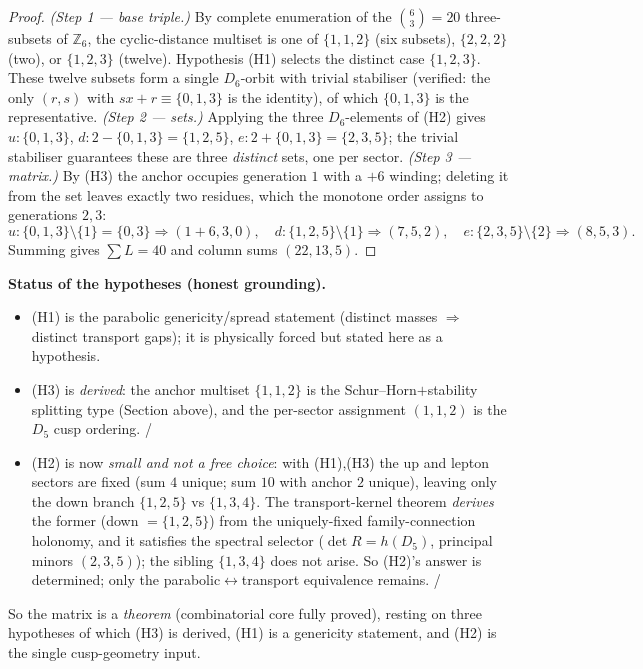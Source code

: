 \documentclass[11pt,a4paper]{article}
\theoremstyle{definition}
\begin{document}
\begin{proof}
\emph{(Step 1 --- base triple.)} By complete enumeration of the $\binom63=20$ three-subsets of
$\mathbb Z_6$, the cyclic-distance multiset is one of $\{1,1,2\}$ (six subsets), $\{2,2,2\}$ (two), or
$\{1,2,3\}$ (twelve). Hypothesis (H1) selects the distinct case $\{1,2,3\}$. These twelve subsets form a
single $D_6$-orbit with trivial stabiliser (verified: the only $(r,s)$ with $sx+r\equiv\{0,1,3\}$ is the
identity), of which $\{0,1,3\}$ is the representative. \emph{(Step 2 --- sets.)} Applying the three
$D_6$-elements of (H2) gives $u:\{0,1,3\}$, $d:2{-}\{0,1,3\}=\{1,2,5\}$, $e:2{+}\{0,1,3\}=\{2,3,5\}$;
the trivial stabiliser guarantees these are three \emph{distinct} sets, one per sector.
\emph{(Step 3 --- matrix.)} By (H3) the anchor occupies generation $1$ with a $+6$ winding; deleting it
from the set leaves exactly two residues, which the monotone order assigns to generations $2,3$:
\[
  u:\{0,1,3\}\!\setminus\!\{1\}=\{0,3\}\Rightarrow(1{+}6,3,0),\quad
  d:\{1,2,5\}\!\setminus\!\{1\}\Rightarrow(7,5,2),\quad
  e:\{2,3,5\}\!\setminus\!\{2\}\Rightarrow(8,5,3).
\]
Summing gives $\sum L=40$ and column sums $(22,13,5)$.
\end{proof}

\noindent\textbf{Status of the hypotheses (honest grounding).}
\begin{itemize}[leftmargin=1.6em]
\item (H1) is the parabolic genericity/spread statement (distinct masses $\Rightarrow$ distinct
transport gaps); it is physically forced but stated here as a hypothesis. \mC
\item (H3) is \emph{derived}: the anchor multiset $\{1,1,2\}$ is the Schur--Horn$+$stability splitting
type (Section above), and the per-sector assignment $(1,1,2)$ is the $D_5$ cusp ordering. \mE/\mC
\item (H2) is now \emph{small and not a free choice}: with (H1),(H3) the up and lepton sectors are fixed
(sum $4$ unique; sum $10$ with anchor $2$ unique), leaving only the down branch $\{1,2,5\}$ vs
$\{1,3,4\}$. The transport-kernel theorem \emph{derives} the former (down $=\{1,2,5\}$) from the
uniquely-fixed family-connection holonomy, and it satisfies the spectral selector ($\det R=h(D_5)$,
principal minors $(2,3,5)$); the sibling $\{1,3,4\}$ does not arise. So (H2)'s answer is determined; only
the parabolic$\leftrightarrow$transport equivalence remains. \mE/\mC
\end{itemize}
So the matrix is a \emph{theorem} (combinatorial core fully proved), resting on three hypotheses of which
(H3) is derived, (H1) is a genericity statement, and (H2) is the single cusp-geometry input.
\end{document}

